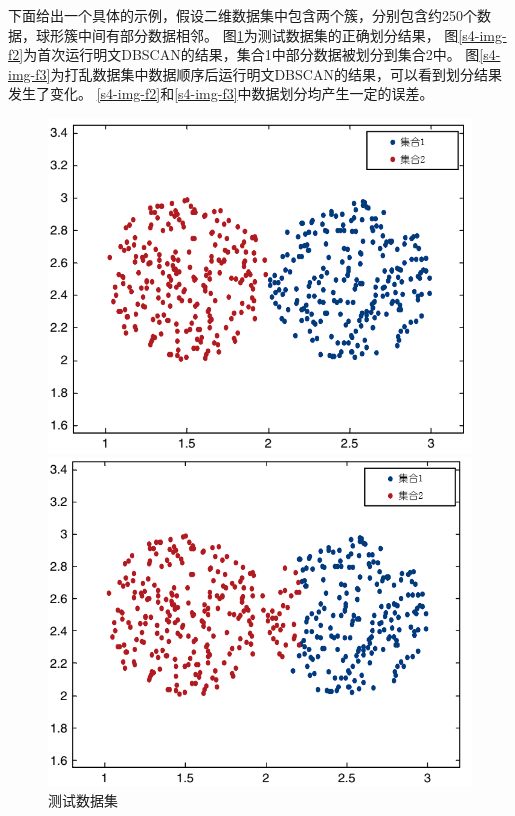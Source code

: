下面给出一个具体的示例，假设二维数据集中包含两个簇，分别包含约250个数据，球形簇中间有部分数据相邻。
图\ref{s4-img-f1}为测试数据集的正确划分结果，
图\ref{s4-img-f2}为首次运行明文DBSCAN的结果，集合1中部分数据被划分到集合2中。
图\ref{s4-img-f3}为打乱数据集中数据顺序后运行明文DBSCAN的结果，可以看到划分结果发生了变化。
\ref{s4-img-f2}和\ref{s4-img-f3}中数据划分均产生一定的误差。

\begin{figure}[htbp] %
	\begin{minipage}[t]{0.3\linewidth}
		\includegraphics[width=\linewidth]{img/expr.png}
		\caption{测试数据集}
		\label{s4-img-f1}
	\end{minipage}%
	\hfill%
	\begin{minipage}[t]{0.3\linewidth}
		\includegraphics[width=\linewidth]{img/expr2.png}

\end{minipage}
\end{figure}

